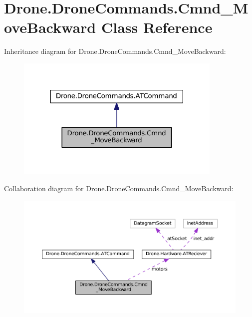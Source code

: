 \hypertarget{class_drone_1_1_drone_commands_1_1_cmnd___move_backward}{}\section{Drone.\+Drone\+Commands.\+Cmnd\+\_\+\+Move\+Backward Class Reference}
\label{class_drone_1_1_drone_commands_1_1_cmnd___move_backward}


Inheritance diagram for Drone.\+Drone\+Commands.\+Cmnd\+\_\+\+Move\+Backward\+:\nopagebreak
\begin{figure}[H]
\begin{center}
\leavevmode
\includegraphics[width=279pt]{class_drone_1_1_drone_commands_1_1_cmnd___move_backward__inherit__graph}
\end{center}
\end{figure}


Collaboration diagram for Drone.\+Drone\+Commands.\+Cmnd\+\_\+\+Move\+Backward\+:\nopagebreak
\begin{figure}[H]
\begin{center}
\leavevmode
\includegraphics[width=350pt]{class_drone_1_1_drone_commands_1_1_cmnd___move_backward__coll__graph}
\end{center}
\end{figure}
